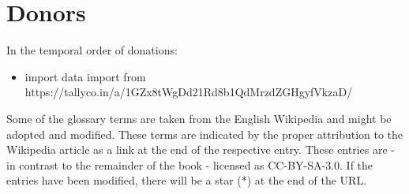 \documentclass[a4paper,12pt,oneside,openany]{book}
\begin{document}
\section{Donors}
In the temporal order of donations:
\begin{itemize}
\item import data import from https://tallyco.in/a/1GZx8tWgDd21Rd8b1QdMrzdZGHgyfVkzaD/


\end{itemize}

\glsaddall

Some of the glossary terms are taken from the English Wikipedia and might be adopted and modified. These terms are indicated by the proper attribution to the Wikipedia article as a link at the end of the respective entry. These entries are - in contrast to the remainder of the book - licensed as CC-BY-SA-3.0. If the entries have been modified, there will be a star (*) at the end of the URL.

\printnoidxglossaries
\end{document}
